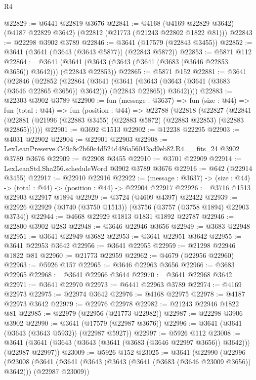 \begin{lexlean}{R4}
\begin{coremodule}
@22829 := @6441 @22819 @3676
@22841 := @4168
    (@4169 @22829 @3642)
    (@4187 @22829 @3642)
    (@22812 (@21773 (@21243 @22802 @1822 @81)))
@22843 := @22298 @3902 @3789
@22846 := @3641 (@17579 (@22843 @3455))
@22852 := @3641 (@3641 (@3643 (@3643 @5877)) (@22843 @5872))
@22853 := @5871 @112
@22864 := @3641 (@3641 (@3643 (@3643 (@3641 (@3683 (@3646 @22853 @3656)) @3642))) (@22843 @22853))
@22865 := @5871 @152
@22881 := @3641
    (@22846
      (@22852
        (@22864
          (@3641
            (@3641 (@3643 (@3643 (@3641 (@3683 (@3646 @22865 @3656)) @3642))) (@22843 @22865))
            @3642))))
@22883 := @22303 @3902 @3789
@22900 := fun (message : @3637) =>
  fun (size : @44) =>
  fun (total : @44) =>
  fun (position : @44) =>
  @22788
    (@22818
      (@22827
        (@22841 (@22881 (@21996 (@22883 @3455) (@22883 @5872) (@22883 @22853) (@22883 @22865))))))
@22901 := @3692 @1513
@22902 := @12238 @22295
@22903 := @4031 @22902
@22904 := @22901 @22903
@22908 := LexLeanPreserve.Cd9c8c2b60c4d524d486a56043ad9eb82.R4.__fits_24 @3902 @3789 @3676
@22909 := @22908 @3455
@22910 := @3701 @22909
@22914 := LexLeanStd.Sha256.scheduleWord @3902 @3789 @3676
@22916 := @642 (@22914 @3455)
@22917 := @22910 @22916
@22922 := (message : @3637) -> (size : @44) -> (total : @44) -> (position : @44) -> @22904 @22917
@22926 := @3716 @1513 @22903 @22917 @1894
@22929 := @3724 (@4609 @4397) @22422
@22939 := @22926 @22929 (@3740 (@3750 @1513)) (@3756 (@3757 (@3758 @1894) @22903 @3734))
@22944 := @4668 @22929 @1813 @1831 @1892 @22787
@22946 := @22800 @3902 @283
@22948 := @3646 @22946 @3656
@22949 := @3683 @22948
@22951 := @3641 @22949 @3682
@22953 := @3641 @22951 @3642
@22955 := @3641 @22953 @3642
@22956 := @3641 @22955
@22959 := @21298 @22946 @1822 @81
@22960 := @21773 @22959
@22962 := @4679 (@22956 @22960)
@22963 := @5926 @157
@22965 := @3646 @22963 @3656
@22966 := @3683 @22965
@22968 := @3641 @22966 @3644
@22970 := @3641 @22968 @3642
@22971 := @3641 @22970
@22973 := @6441 @22963 @3789
@22974 := @4169 @22973
@22975 := @22974 @3642
@22976 := @4168 @22975
@22978 := @4187 @22973 @3642
@22979 := @22976 @22978
@22982 := @21243 @22946 @1822 @81
@22985 := @22979 (@22956 (@21773 @22982))
@22987 := @22298 @3906 @3902
@22990 := @3641 (@17579 (@22987 @3676))
@22996 := @3641 (@3641 (@3643 (@3643 @5932)) (@22987 @5927))
@22997 := @5926 @112
@23008 := @3641 (@3641 (@3643 (@3643 (@3641 (@3683 (@3646 @22997 @3656)) @3642))) (@22987 @22997))
@23009 := @5926 @152
@23025 := @3641
    (@22990
      (@22996
        (@23008
          (@3641
            (@3641 (@3643 (@3643 (@3641 (@3683 (@3646 @23009 @3656)) @3642))) (@22987 @23009))

\end{coremodule}
\end{lexlean}
